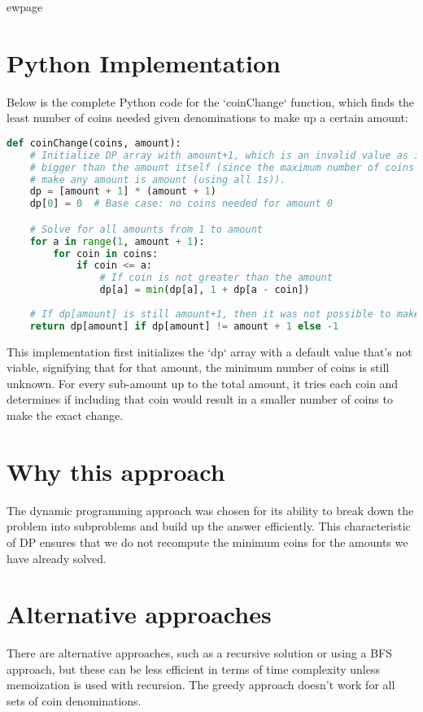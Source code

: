ewpage %
\section*{Python Implementation}
Below is the complete Python code for the `coinChange` function, which finds the least number of coins needed given denominations to make up a certain amount:

\begin{fullwidth}
\begin{lstlisting}[language=Python]
def coinChange(coins, amount):
    # Initialize DP array with amount+1, which is an invalid value as it's
    # bigger than the amount itself (since the maximum number of coins to
    # make any amount is amount (using all 1s)).
    dp = [amount + 1] * (amount + 1)
    dp[0] = 0  # Base case: no coins needed for amount 0

    # Solve for all amounts from 1 to amount
    for a in range(1, amount + 1):
        for coin in coins:
            if coin <= a:
                # If coin is not greater than the amount
                dp[a] = min(dp[a], 1 + dp[a - coin])
    
    # If dp[amount] is still amount+1, then it was not possible to make change
    return dp[amount] if dp[amount] != amount + 1 else -1
\end{lstlisting}

\end{fullwidth}

This implementation first initializes the `dp` array with a default value that's not viable, signifying that for that amount, the minimum number of coins is still unknown. For every sub-amount up to the total amount, it tries each coin and determines if including that coin would result in a smaller number of coins to make the exact change.

\section*{Why this approach}
The dynamic programming approach was chosen for its ability to break down the problem into subproblems and build up the answer efficiently. This characteristic of DP ensures that we do not recompute the minimum coins for the amounts we have already solved.

\section*{Alternative approaches}
There are alternative approaches, such as a recursive solution or using a BFS approach, but these can be less efficient in terms of time complexity unless memoization is used with recursion. The greedy approach doesn't work for all sets of coin denominations.

